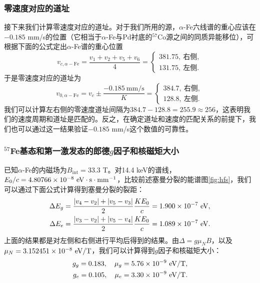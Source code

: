 \documentclass[font=default]{mpltx}
\begin{document}
\subsubsection{零速度对应的道址}
接下来我们计算零速度对应的道址。对于我们所用的源，$\alpha$-Fe六线谱的重心应该在$-0.185$ mm/s的位置（它相当于$\alpha$-Fe与Pd衬底的$^{57}$Co源之间的同质异能移位），可根据下面的公式定出$\alpha$-Fe谱的重心位置
$$v_{c,\alpha-\text{Fe}}=\frac{v_1+v_2+v_5+v_6}{4}=\left\{\begin{aligned}
  381.75,\ \mbox{右侧},\\
  131.75,\ \mbox{左侧}.
\end{aligned}\right.$$于是零速度对应的道址为
$$v_{0,\alpha-\text{Fe}}=v_c\pm\frac{-0.185\ \text{mm/s}}{K}=\left\{\begin{aligned}
  384.7,\ \mbox{右侧},\\
  128.8,\ \mbox{左侧}.
\end{aligned}\right.$$我们可以计算左右侧的零速度道址间隔为$384.7-128.8=255.9\approx256$，这表明我们的速度周期和道址是匹配的。反之，在确定道址和速度的匹配关系的前提下，我们也可以通过这一结果验证$-0.185$ mm/s这个数值的可靠性。

\subsubsection{$^{57}$Fe基态和第一激发态的郎德$g$因子和核磁矩大小}
已知$\alpha$-Fe的内磁场为$B_{\text{int}}=33.3$ T。对14.4 keV的谱线，$E_0/c=4.80766\times10^{-8}\ {\rm eV\cdot s\cdot mm^{-1}}$，比较前述塞曼分裂的能谱图\autoref{fig:hfs}，我们可以通过下面公式计算得到塞曼分裂的裂距：
$$\begin{aligned}
  \Delta E_g=\frac{|v_4-v_2|+|v_5-v_3|}{2}\frac{KE_0}{c}=1.900\times10^{-7}\ {\rm eV},\\
  \Delta E_e=\frac{|v_3-v_2|+|v_5-v_4|}{2}\frac{KE_0}{c}=1.089\times10^{-7}\ {\rm eV}.
\end{aligned}$$
上面的结果都是对左侧和右侧进行平均后得到的结果。由$\Delta=g\mu_NB$，以及$\mu_N=3.152451\times10^{-8}\ {\rm eV/T}$，我们可以计算得到$g$因子和核磁矩大小：
$$\begin{aligned}
  g_g=0.183,\quad \mu_g=5.76\times10^{-9}\ {\rm eV/T},\\
  g_e=0.105,\quad \mu_e=3.30\times10^{-9}\ {\rm eV/T}.
\end{aligned}$$
\end{document}
